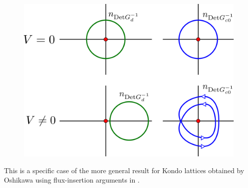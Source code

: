 \documentclass[10pt]{report}
\numberwithin{equation}{section}
\begin{document}
\begin{figure}[htpb]
	\centering
	\includegraphics[scale=0.2]{../figures/luttinger_top_change.png}
\end{figure}
This is a specific case of the more general result for Kondo lattices obtained by Oshikawa using flux-insertion arguments in \cite{oshikawa2000topological}.
\end{document}
